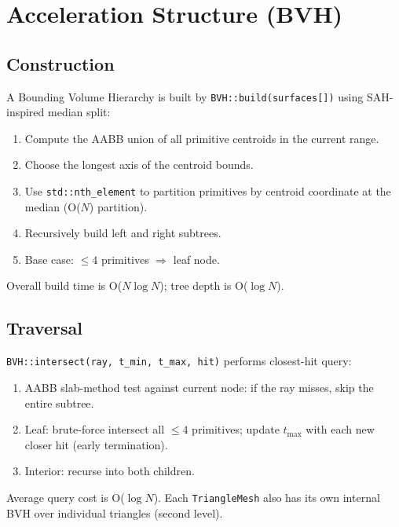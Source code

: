 \documentclass[12pt,a4paper]{report}
\begin{document}
\chapter{Acceleration Structure (BVH)}

\section{Construction}

A Bounding Volume Hierarchy is built by \texttt{BVH::build(surfaces[])} using SAH-inspired
median split:

\begin{enumerate}
  \item Compute the AABB union of all primitive centroids in the current range.
  \item Choose the longest axis of the centroid bounds.
  \item Use \texttt{std::nth\_element} to partition primitives by centroid coordinate at the
        median (O($N$) partition).
  \item Recursively build left and right subtrees.
  \item Base case: $\leq 4$ primitives $\Rightarrow$ leaf node.
\end{enumerate}

Overall build time is O($N\log N$); tree depth is O($\log N$).

\section{Traversal}

\texttt{BVH::intersect(ray, t\_min, t\_max, hit)} performs closest-hit query:

\begin{enumerate}
  \item AABB slab-method test against current node: if the ray misses, skip the entire subtree.
  \item Leaf: brute-force intersect all $\leq 4$ primitives; update $t_{\max}$ with each new
        closer hit (early termination).
  \item Interior: recurse into both children.
\end{enumerate}

Average query cost is O($\log N$).  Each \texttt{TriangleMesh} also has its own internal BVH
over individual triangles (second level).
\end{document}
